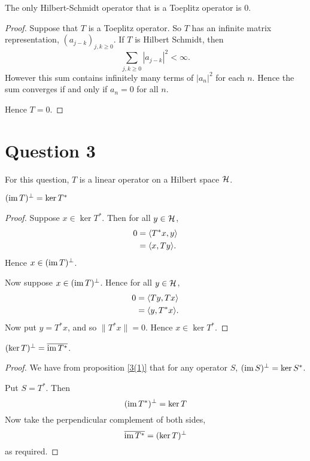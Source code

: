 \documentclass{unswmaths}
\begin{document}
\begin{theorem}
    The only Hilbert-Schmidt operator that is a Toeplitz operator
    is $0$.
\end{theorem}
\begin{proof}
    Suppose that $T$ is a Toeplitz operator. So $T$ has an infinite matrix
    representation, $(a_{j-k})_{j,k\geq 0}$. If $T$ is Hilbert Schmidt, then
    \begin{equation*}
        \sum_{j,k\geq 0} |a_{j-k}|^2 < \infty.
    \end{equation*}
    However this sum contains infinitely many terms of $|a_n|^2$ for each $n$.
    Hence the sum converges if and only if $a_n = 0$ for all $n$.
    
    Hence $T = 0$.
\end{proof} 
\section*{Question 3}
For this question, $T$ is a linear operator
on a Hilbert space $\mathcal{H}$.
\begin{proposition}
\label{3(1)}
    $(\operatorname{im} T)^\perp = \ker T^*$
\end{proposition}
\begin{proof}
    Suppose $x \in \ker T^*$. Then for all $y \in \mathcal{H}$,
    \begin{align*}
        0 &= \langle T^*x,y\rangle\\
          &= \langle x,Ty\rangle.
    \end{align*}
    Hence $x \in (\operatorname{im} T)^\perp$. 
    
    Now suppose $x \in (\operatorname{im} T)^\perp$. Hence for all
    $y \in \mathcal{H}$, 
    \begin{align*}
        0 &= \langle Ty,Tx\rangle\\
        &= \langle y,T^*x\rangle.
    \end{align*}
    Now put $y = T^*x$, and so $\| T^*x\| = 0$. Hence
    $x \in \ker T^*$.
\end{proof}
\begin{proposition}
    $(\ker T)^\perp = \overline{\operatorname{im} T^*}$.
\end{proposition}
\begin{proof}
    We have from proposition \ref{3(1)} that for
    any operator $S$, $(\operatorname{im} S)^\perp = \ker S^*$.
    
    Put $S = T^*$. Then
    \begin{equation*}
        (\operatorname{im} T^*)^\perp = \ker T
    \end{equation*}
    Now take the perpendicular complement of both
    sides,
    \begin{equation*}
        \overline{\operatorname{im} T^*} = (\ker T)^\perp
    \end{equation*}
    as required.
\end{proof}
\end{document}
